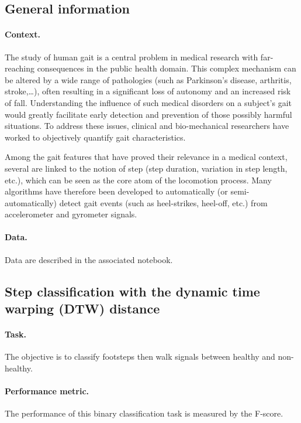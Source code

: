 \documentclass[11pt]{article}
\begin{document}
\subsection{General information}

\paragraph{Context.}
The study of human gait is a central problem in medical research with far-reaching consequences in the public health domain. This complex mechanism can be altered by a wide range of pathologies (such as Parkinson's disease, arthritis, stroke,\ldots), often resulting in a significant loss of autonomy and an increased risk of fall. Understanding the influence of such medical disorders on a subject's gait would greatly facilitate early detection and prevention of those possibly harmful situations. To address these issues, clinical and bio-mechanical researchers have worked to objectively quantify gait characteristics.

Among the gait features that have proved their relevance in a medical context, several are linked to the notion of step (step duration, variation in step length, etc.), which can be seen as the core atom of the locomotion process. Many algorithms have therefore been developed to automatically (or semi-automatically) detect gait events (such as heel-strikes, heel-off, etc.) from accelerometer and gyrometer signals.

\paragraph{Data.}
Data are described in the associated notebook.

\subsection{Step classification with the dynamic time warping (DTW) distance}

\paragraph{Task.} The objective is to classify footsteps then walk signals between healthy and non-healthy.

\paragraph{Performance metric.} The performance of this binary classification task is measured by the F-score.
\end{document}
